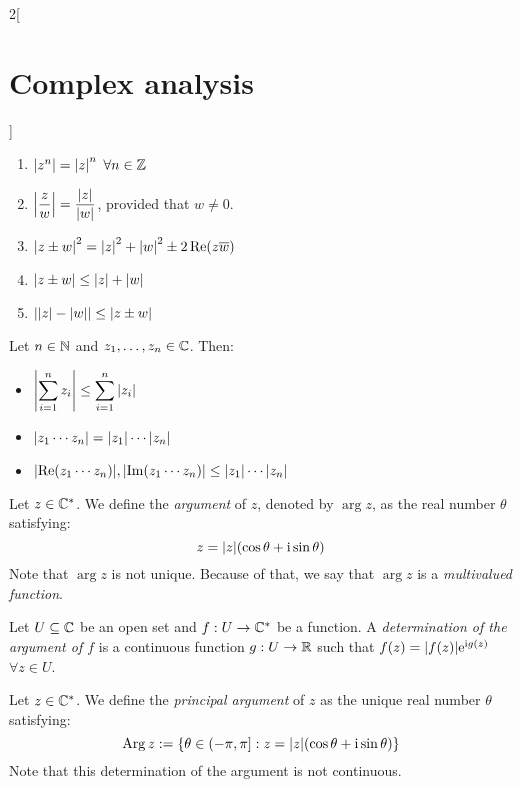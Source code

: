 \documentclass[../../../main_math.tex]{subfiles}
\begin{document}
\begin{multicols}{2}[\section{Complex analysis}]
\begin{proposition}
\begin{enumerate}
      \item $\abs{z^n}={\abs{z}}^n$ $\forall n\in\mathbb{Z}$
      \item $\displaystyle\abs{\frac{z}{w}}=\frac{\abs{z}}{\abs{w}}$, provided that $w\ne 0$.
      \item ${\abs{z\pm w}}^2={\abs{z}}^2+{\abs{w}}^2\pm 2\Re(z\overline{w})$
      \item $\abs{z\pm w}\leq \abs{z}+ \abs{w}$
      \item $\abs{\abs{z}-\abs{w}}\leq \abs{z\pm w}$
    \end{enumerate}
  \end{proposition}
  \begin{corollary}
    Let $n\in\mathbb{N}$ and $z_1, \ldots, z_n \in \mathbb{C}$. Then:
    \begin{itemize}
      \item $\displaystyle \abs{\sum_{i=1}^n{z_i}} \leq \sum_{i=1}^n{\abs{z_i}}$
      \item $\displaystyle \abs{z_1 \cdots z_n} = \abs{z_1} \cdots \abs{z_n}$
      \item $\displaystyle \abs{\Re(z_1 \cdots z_n)},\abs{\Im(z_1 \cdots z_n)} \leq \abs{z_1} \cdots \abs{z_n}$
    \end{itemize}
  \end{corollary}
  \begin{definition}
    Let $z \in \mathbb{C}^*$. We define the \emph{argument} of $z$, denoted by $\arg{z}$, as the real number $\theta$ satisfying: $$z = \abs{z}(\cos{\theta} + \mathrm{i}\sin{\theta})$$ Note that $\arg{z}$ is not unique. Because of that, we say that $\arg z$ is a \emph{multivalued function}.
  \end{definition}
  \begin{definition}
    Let $U\subseteq\mathbb{C}$ be an open set and $f: U\rightarrow\mathbb{C}^*$ be a function. A \emph{determination of the argument of $f$} is a continuous function $g:U\rightarrow \mathbb{R}$ such that $f(z)=\abs{f(z)}\mathrm{e}^{\mathrm{i} g(z)}$ $\forall z\in U$.
  \end{definition}
  \begin{definition}
    Let $z \in \mathbb{C}^*$. We define the \emph{principal argument} of $z$ as the unique real number $\theta$ satisfying:
    $$\operatorname{Arg} z := \{\theta \in (-\pi, \pi]:z = \abs{z}(\cos{\theta} + \mathrm{i}\sin{\theta})\}$$
    Note that this determination of the argument is not continuous.

\end{definition}
\end{multicols}
\end{document}
